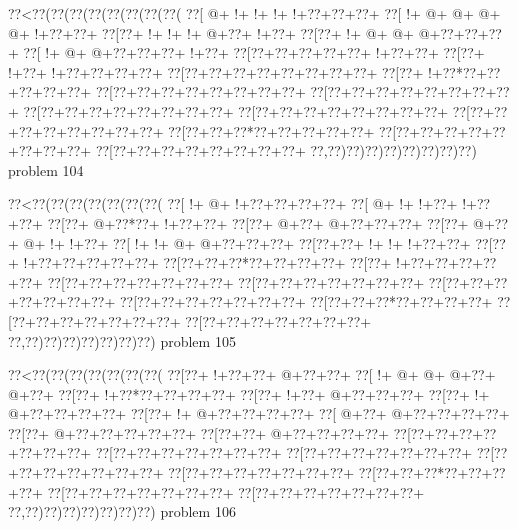 \vbox{\vbox{\goo
\0??<\0??(\0??(\0??(\0??(\0??(\0??(\0??(\0??(
\0??[\- @+\- !+\- !+\- !+\- !+\0??+\0??+\0??+
\0??[\- !+\- @+\- @+\- @+\- @+\- !+\0??+\0??+
\0??[\0??+\- !+\- !+\- !+\- @+\0??+\- !+\0??+
\0??[\0??+\- !+\- @+\- @+\- @+\0??+\0??+\0??+
\0??[\- !+\- @+\- @+\0??+\0??+\0??+\- !+\0??+
\0??[\0??+\0??+\0??+\0??+\0??+\- !+\0??+\0??+
\0??[\0??+\- !+\0??+\- !+\0??+\0??+\0??+\0??+
\0??[\0??+\0??+\0??+\0??+\0??+\0??+\0??+\0??+
\0??[\0??+\- !+\0??*\0??+\0??+\0??+\0??+\0??+
\0??[\0??+\0??+\0??+\0??+\0??+\0??+\0??+\0??+
\0??[\0??+\0??+\0??+\0??+\0??+\0??+\0??+\0??+
\0??[\0??+\0??+\0??+\0??+\0??+\0??+\0??+\0??+
\0??[\0??+\0??+\0??+\0??+\0??+\0??+\0??+\0??+
\0??[\0??+\0??+\0??+\0??+\0??+\0??+\0??+\0??+
\0??[\0??+\0??+\0??*\0??+\0??+\0??+\0??+\0??+
\0??[\0??+\0??+\0??+\0??+\0??+\0??+\0??+\0??+
\0??[\0??+\0??+\0??+\0??+\0??+\0??+\0??+\0??+
\0??,\0??)\0??)\0??)\0??)\0??)\0??)\0??)\0??)
}
\hfil problem 104\hfil\break
}

\vbox{\vbox{\goo
\0??<\0??(\0??(\0??(\0??(\0??(\0??(\0??(
\0??[\- !+\- @+\- !+\0??+\0??+\0??+\0??+
\0??[\- @+\- !+\- !+\0??+\- !+\0??+\0??+
\0??[\0??+\- @+\0??*\0??+\- !+\0??+\0??+
\0??[\0??+\- @+\0??+\- @+\0??+\0??+\0??+
\0??[\0??+\- @+\0??+\- @+\- !+\- !+\0??+
\0??[\- !+\- !+\- @+\- @+\0??+\0??+\0??+
\0??[\0??+\0??+\- !+\- !+\- !+\0??+\0??+
\0??[\0??+\- !+\0??+\0??+\0??+\0??+\0??+
\0??[\0??+\0??+\0??*\0??+\0??+\0??+\0??+
\0??[\0??+\- !+\0??+\0??+\0??+\0??+\0??+
\0??[\0??+\0??+\0??+\0??+\0??+\0??+\0??+
\0??[\0??+\0??+\0??+\0??+\0??+\0??+\0??+
\0??[\0??+\0??+\0??+\0??+\0??+\0??+\0??+
\0??[\0??+\0??+\0??+\0??+\0??+\0??+\0??+
\0??[\0??+\0??+\0??*\0??+\0??+\0??+\0??+
\0??[\0??+\0??+\0??+\0??+\0??+\0??+\0??+
\0??[\0??+\0??+\0??+\0??+\0??+\0??+\0??+
\0??,\0??)\0??)\0??)\0??)\0??)\0??)\0??)
}
\hfil problem 105\hfil\break
}

\vbox{\vbox{\goo
\0??<\0??(\0??(\0??(\0??(\0??(\0??(\0??(
\0??[\0??+\- !+\0??+\0??+\- @+\0??+\0??+
\0??[\- !+\- @+\- @+\- @+\0??+\- @+\0??+
\0??[\0??+\- !+\0??*\0??+\0??+\0??+\0??+
\0??[\0??+\- !+\0??+\- @+\0??+\0??+\0??+
\0??[\0??+\- !+\- @+\0??+\0??+\0??+\0??+
\0??[\0??+\- !+\- @+\0??+\0??+\0??+\0??+
\0??[\- @+\0??+\- @+\0??+\0??+\0??+\0??+
\0??[\0??+\- @+\0??+\0??+\0??+\0??+\0??+
\0??[\0??+\0??+\- @+\0??+\0??+\0??+\0??+
\0??[\0??+\0??+\0??+\0??+\0??+\0??+\0??+
\0??[\0??+\0??+\0??+\0??+\0??+\0??+\0??+
\0??[\0??+\0??+\0??+\0??+\0??+\0??+\0??+
\0??[\0??+\0??+\0??+\0??+\0??+\0??+\0??+
\0??[\0??+\0??+\0??+\0??+\0??+\0??+\0??+
\0??[\0??+\0??+\0??*\0??+\0??+\0??+\0??+
\0??[\0??+\0??+\0??+\0??+\0??+\0??+\0??+
\0??[\0??+\0??+\0??+\0??+\0??+\0??+\0??+
\0??,\0??)\0??)\0??)\0??)\0??)\0??)\0??)
}
\hfil problem 106\hfil\break
}

